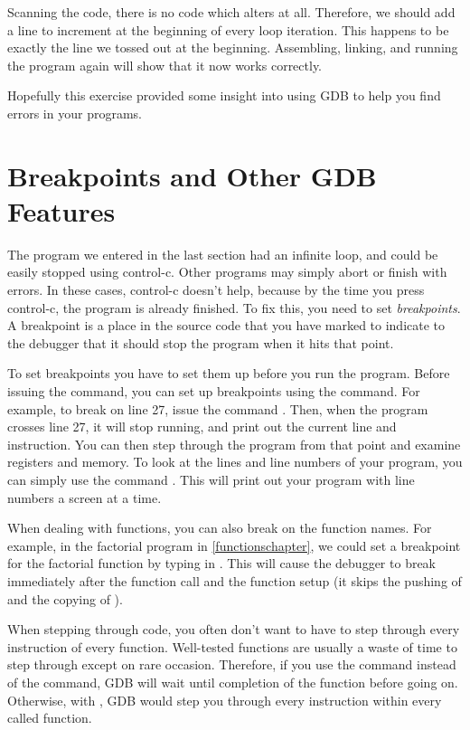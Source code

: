 Scanning the code, there is no code which alters {\ediReg} at all.  Therefore,
we should add a line to increment {\ediReg} at the beginning of every loop
iteration.  This happens to be exactly the line we tossed out at the beginning.
Assembling, linking, and running the program again will show that it now
works correctly.

Hopefully this exercise provided some insight into using GDB to help you
find errors in your programs.

\section{Breakpoints and Other GDB Features}

The program we entered in the last section had an infinite loop, and could be
easily stopped using control-c.  Other programs may simply abort or finish
with errors.  In these cases, control-c doesn't help, because by the time
you press control-c, the program is already finished.  To fix this, you
need to set \emph{breakpoints}.  A breakpoint is a place
in the source code that you have marked to indicate to the debugger that
it should stop the program when it hits that point.

To set breakpoints you have to set them up before you run the
program.  Before issuing the
 command, you can set up breakpoints using the
 command.  For example, to break on line 27, 
issue the command .  Then, when the program
crosses line 27, it will stop running, and print out the current line
and instruction.  You can then step through the program from that 
point and examine registers and memory.  To look at the lines and line
numbers of your program, you can simply use the command .
This will print out your program with line numbers a screen at a time.

When dealing with functions, you can also break on the function names.
For example, in the factorial program in \autoref{functionschapter},
we could set a breakpoint for the factorial function by typing in
.  This will cause the debugger to 
break immediately after the function call and the function setup (it
skips the pushing of {\ebpRegIdx} and the copying of {\espRegIdx}).

When stepping through code, you often don't want to have to step through
every instruction of every function.  Well-tested functions are usually
a waste of time to step through except on rare occasion.  Therefore, if
you use the  command instead of the 
 command, GDB will wait until completion of the
function before going on.  Otherwise, with , GDB
would step you through every instruction within every called function.

